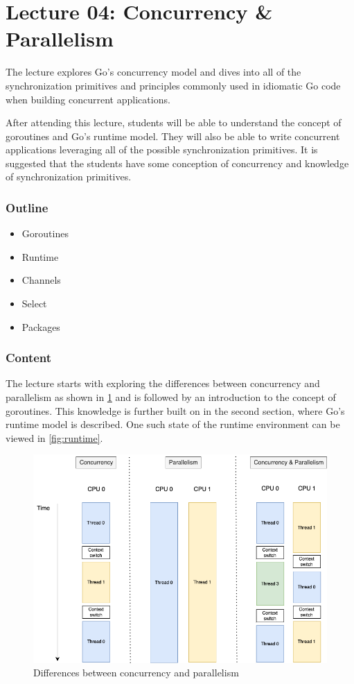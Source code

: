 \documentclass[
  digital,
  color,
  oneside,
  nosansbold,
  nocolorbold,
  nolof,
  nolot,
]{fithesis4}
\begin{document}
\section{Lecture 04: Concurrency \& Parallelism}

The lecture explores Go's concurrency model and dives into all of the synchronization primitives and principles commonly used in idiomatic Go code when building concurrent applications.

After attending this lecture, students will be able to understand the concept of goroutines and Go's runtime model. They will also be able to write concurrent applications leveraging all of the possible synchronization primitives. It is suggested that the students have some conception of concurrency and knowledge of synchronization primitives.

\subsubsection{Outline}

\begin{itemize}
    \item Goroutines
    \item Runtime
    \item Channels
    \item Select
    \item Packages
\end{itemize}

\subsubsection{Content}

The lecture starts with exploring the differences between concurrency and parallelism as shown in \cref{fig:con-vs-par} and is followed by an introduction to the concept of goroutines. This knowledge is further built on in the second section, where Go's runtime model is described. One such state of the runtime environment can be viewed in \cref{fig:runtime}.

\begin{figure}[H]
    \centering
    \includegraphics[width=12cm]{figures/concurrency-parallelism.png}
    \caption{Differences between concurrency and parallelism}
    \label{fig:con-vs-par}
\end{figure}
\end{document}
